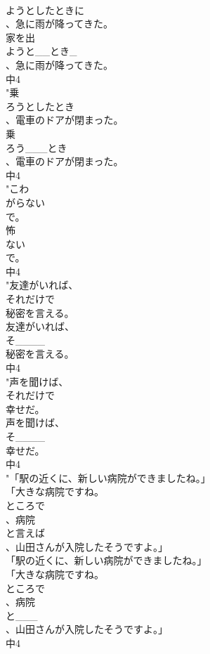 \documentclass[8pt]{extreport}
\begin{document}
\begin{CJK}{UTF8}{min}
\\	ようとしたときに
\\	、急に雨が降ってきた。
\\	家を出
\\	ようと__とき_
\\	、急に雨が降ってきた。
\\	中4
\\	"乗
\\	ろうとしたとき
\\	、電車のドアが閉まった。
\\	乗
\\	ろう___とき
\\	、電車のドアが閉まった。
\\	中4
\\	"こわ
\\	がらない
\\	で。
\\	怖
\\	ない
\\	で。
\\	中4
\\	"友達がいれば、
\\	それだけで
\\	秘密を言える。
\\	友達がいれば、
\\	そ____
\\	秘密を言える。
\\	中4
\\	"声を聞けば、
\\	それだけで
\\	幸せだ。
\\	声を聞けば、
\\	そ____
\\	幸せだ。
\\	中4
\\	"「駅の近くに、新しい病院ができましたね。」
\\	「大きな病院ですね。
\\	ところで
\\	、病院
\\	と言えば
\\	、山田さんが入院したそうですよ。」
\\	「駅の近くに、新しい病院ができましたね。」
\\	「大きな病院ですね。
\\	ところで
\\	、病院
\\	と___
\\	、山田さんが入院したそうですよ。」
\\	中4

\end{CJK}
\end{document}
